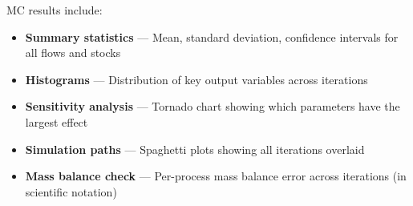 MC results include:
\begin{itemize}
  \item \textbf{Summary statistics} --- Mean, standard deviation, confidence intervals for all flows and stocks
  \item \textbf{Histograms} --- Distribution of key output variables across iterations
  \item \textbf{Sensitivity analysis} --- Tornado chart showing which parameters have the largest effect
  \item \textbf{Simulation paths} --- Spaghetti plots showing all iterations overlaid
  \item \textbf{Mass balance check} --- Per-process mass balance error across iterations (in scientific notation)
\end{itemize}
